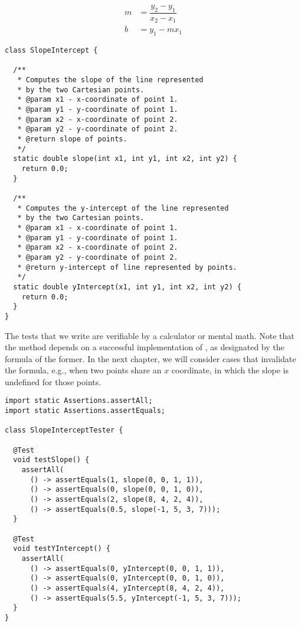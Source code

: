 \begin{align*}
m &= \dfrac{y_2-y_1}{x_2-x_1}\\
b &= y_1 - mx_1
\end{align*}


\begin{lstlisting}[language=MyJava]
class SlopeIntercept {

  /**
   * Computes the slope of the line represented 
   * by the two Cartesian points.
   * @param x1 - x-coordinate of point 1.
   * @param y1 - y-coordinate of point 1.
   * @param x2 - x-coordinate of point 2.
   * @param y2 - y-coordinate of point 2.
   * @return slope of points.
   */
  static double slope(int x1, int y1, int x2, int y2) {
    return 0.0;
  }

  /**
   * Computes the y-intercept of the line represented 
   * by the two Cartesian points.
   * @param x1 - x-coordinate of point 1.
   * @param y1 - y-coordinate of point 1.
   * @param x2 - x-coordinate of point 2.
   * @param y2 - y-coordinate of point 2.
   * @return y-intercept of line represented by points.
   */
  static double yIntercept(x1, int y1, int x2, int y2) {
    return 0.0;
  }
}
\end{lstlisting}

The tests that we write are verifiable by a calculator or mental math. Note that the  method depends on a successful implementation of , as designated by the formula of the former. In the next chapter, we will consider cases that invalidate the formula, e.g., when two points share an $x$ coordinate, in which the slope is undefined for those points.

\begin{lstlisting}[language=MyJava]
import static Assertions.assertAll;
import static Assertions.assertEquals;

class SlopeInterceptTester {
  
  @Test
  void testSlope() {
    assertAll(
      () -> assertEquals(1, slope(0, 0, 1, 1)),
      () -> assertEquals(0, slope(0, 0, 1, 0)),
      () -> assertEquals(2, slope(8, 4, 2, 4)),
      () -> assertEquals(0.5, slope(-1, 5, 3, 7)));
  }

  @Test
  void testYIntercept() {
    assertAll(
      () -> assertEquals(0, yIntercept(0, 0, 1, 1)),
      () -> assertEquals(0, yIntercept(0, 0, 1, 0)),
      () -> assertEquals(4, yIntercept(8, 4, 2, 4)),
      () -> assertEquals(5.5, yIntercept(-1, 5, 3, 7)));
  }
}
\end{lstlisting}

